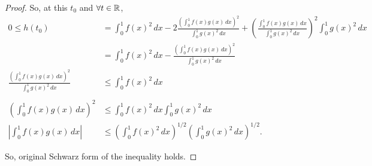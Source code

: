 \documentclass[..hw1]{subfiles}
\begin{document}
\begin{proof}
	So, at this $t_0$ and $\forall t\in \mathbb{R}$,
	\begin{align*}
		0\le h(t_0)                                                                       & = \int_{0}^{1} {f(x)}^2\,dx -2 \frac{{\left( \int_{0}^{1} f(x)g(x)\,dx  \right) }^2}{\int_{0}^{1} {g(x)}^2\,dx } + {\left( \frac{\int_{0}^{1} f(x)g(x)\,dx }{\int_{0}^{1} {g(x)}^2\,dx  } \right) }^2 \int_{0}^{1} {g(x)}^2\,dx \\
		                                                                                  & = \int_{0}^{1} {f(x)}^2  \,dx - \frac{{\left( \int_{0}^{1} f(x)g(x) \,dx \right) }^2}{\int_{0}^{1} {g(x)}^2 \,dx}                                                                                                               \\
		\frac{{\left( \int_{0}^{1} f(x)g(x) \,dx \right) }^2}{\int_{0}^{1} {g(x)}^2 \,dx} & \le \int_{0}^{1} {f(x)}^2 \,dx                                                                                                                                                                                                  \\                                                                                                                                                                                  \\
		{\left( \int_{0}^{1} f(x)g(x) \,dx \right) }^2                                    & \le \int_{0}^{1} {f(x)}^2 \,dx \int_{0}^{1} {g(x)}^2\,dx                                                                                                                                                                        \\
		\left|\int_{0}^{1}f(x)g(x)\,dx\right|                                             & \le {\left(\int_{0}^{1}{f(x)}^2\,dx\right)}^{1/2}{\left(\int_{0}^{1}{g(x)}^2\,dx\right)}^{1/2}.
	\end{align*}

	So, original Schwarz form of the inequality holds.
\end{proof}
\end{document}

